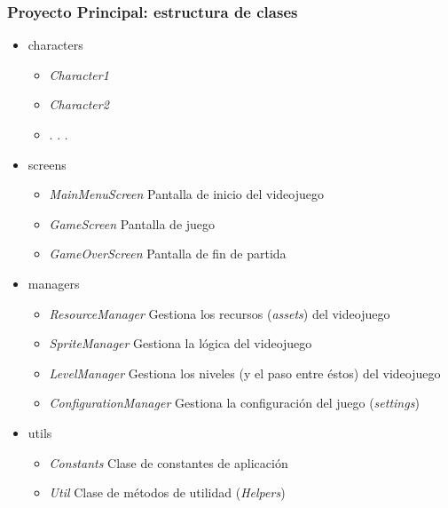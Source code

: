 \documentclass[xcolor={dvipsnames}]{beamer}
\begin{document}
\begin{frame}[plain]\frametitle{Proyecto Principal: estructura de clases}
	\begin{block}{}
	\begin{itemize}
		\item characters
		\begin{itemize}
			\item \emph{\textcolor{resalta}{Character1}}
			\item \emph{\textcolor{resalta}{Character2}}
			\item . . .
		\end{itemize}
		\item screens
		\begin{itemize}
			\item \emph{\textcolor{resalta}{MainMenuScreen}} Pantalla de inicio del videojuego
			\item \emph{\textcolor{resalta}{GameScreen}} Pantalla de juego
			\item \emph{\textcolor{resalta}{GameOverScreen}} Pantalla de fin de partida
		\end{itemize}
		\item managers
		\begin{itemize}
			\item \emph{\textcolor{resalta}{ResourceManager}} Gestiona los recursos (\emph{assets}) del videojuego
			\item \emph{\textcolor{resalta}{SpriteManager}} Gestiona la lógica del videojuego
			\item \emph{\textcolor{resalta}{LevelManager}} Gestiona los niveles (y el paso entre éstos) del videojuego
			\item \emph{\textcolor{resalta}{ConfigurationManager}} Gestiona la configuración del juego (\emph{settings})
		\end{itemize}
		\item utils
		\begin{itemize}
			\item \emph{\textcolor{resalta}{Constants}} Clase de constantes de aplicación
			\item \emph{\textcolor{resalta}{Util}} Clase de métodos de utilidad (\emph{Helpers})
		\end{itemize}
	\end{itemize}
	\end{block}
\end{frame}
\end{document}
